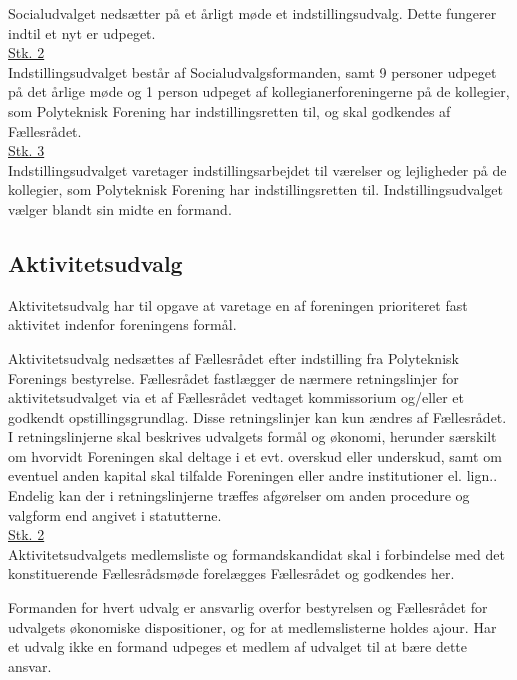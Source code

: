 \begin{list}
\item Socialudvalget nedsætter på et årligt møde et indstillingsudvalg. Dette fungerer indtil et nyt er udpeget.\\

\underline{Stk. 2} \\
Indstillingsudvalget består af Socialudvalgsformanden, samt 9 personer udpeget på det årlige møde og 1 person udpeget af kollegianerforeningerne på de kollegier, som Polyteknisk Forening har indstillingsretten til, og skal godkendes af Fællesrådet.\\

\underline{Stk. 3} \\
Indstillingsudvalget varetager indstillingsarbejdet til værelser og lejligheder på de kollegier, som Polyteknisk Forening har indstillingsretten til. Indstillingsudvalget vælger blandt sin midte en formand.



\subsection{Aktivitetsudvalg}
\label{L:kap:aktivitetsudvalg}
\item Aktivitetsudvalg har til opgave at varetage en af foreningen prioriteret fast aktivitet indenfor foreningens formål.

\item \label{L:Aktivitet:nedsaettelse} Aktivitetsudvalg nedsættes af Fællesrådet efter indstilling fra Polyteknisk Forenings bestyrelse. Fællesrådet fastlægger de nærmere retningslinjer for aktivitetsudvalget via et af Fællesrådet vedtaget kommissorium og/eller et godkendt opstillingsgrundlag. Disse retningslinjer kan kun ændres af Fællesrådet. I retningslinjerne skal beskrives udvalgets formål og økonomi, herunder særskilt om hvorvidt Foreningen skal deltage i et evt. overskud eller underskud, samt om eventuel anden kapital skal tilfalde Foreningen eller andre institutioner el. lign.. Endelig kan der i retningslinjerne træffes afgørelser om anden procedure og valgform end angivet i statutterne.\\

\underline{Stk. 2}\\
Aktivitetsudvalgets medlemsliste og formandskandidat skal i forbindelse med det konstituerende Fællesrådsmøde forelægges Fællesrådet og godkendes her.\\

\item Formanden for hvert udvalg er ansvarlig overfor bestyrelsen og Fællesrådet for udvalgets økonomiske dispositioner, og for at medlemslisterne holdes ajour. Har et udvalg ikke en formand udpeges et medlem af udvalget til at bære dette ansvar.

\end{list}
